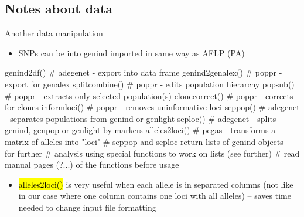 \documentclass[compress, ucs, xelatex, 11pt, xcolor=svgnames,
  hyperref={
    bookmarks=true,
    unicode=true,
    colorlinks=true,
    pdftitle={Molecular data in R},
    plainpages=false,
    pdfauthor={Vojtech Zeisek},
    pdfsubject={Course about phylogeny and evolution in R},
    pdfcreator={XeLaTeX},
    pdfkeywords={R, evolution, phylogeny, molecular data},
    linkcolor=Tomato,
    anchorcolor=SaddleBrown,
    citecolor=Goldenrod,
    filecolor=DarkMagenta,
    menucolor=Sienna,
    urlcolor=DarkTurquoise,
    pdftex},
  url={hyphens, lowtilde} %
  ]{beamer}
\renewcommand{\texttt}[1]{\hl{\ttfamily #1}}
\begin{document}
\subsection{Notes about data}

\begin{frame}[fragile]{Another data manipulation}
  \begin{itemize}
    \item SNPs can be into genind imported in same way as AFLP (PA)
  \end{itemize}
  \begin{spluscode}
    genind2df() # adegenet - export into data frame
    genind2genalex() # poppr - export for genalex
    splitcombine() # poppr - edits population hierarchy
    popsub() # poppr - extracts only selected population(s)
    clonecorrect() # poppr - corrects for clones
    informloci() # poppr - removes uninformative loci
    seppop() # adegenet - separates populations from genind or genlight
    seploc() # adegenet - splits genind, genpop or genlight by markers
    alleles2loci() # pegas - transforms a matrix of alleles into "loci"
    # seppop and seploc return lists of genind objects - for further
    # analysis using special functions to work on lists (see further)
    # read manual pages (?...) of the functions before usage
  \end{spluscode}
  \begin{itemize}
    \item \texttt{alleles2loci()} is very useful when each allele is in separated columns (not like in our case where one column contains one loci with all alleles) -- saves time needed to change input file formatting
  \end{itemize}
\end{frame}
\end{document}
